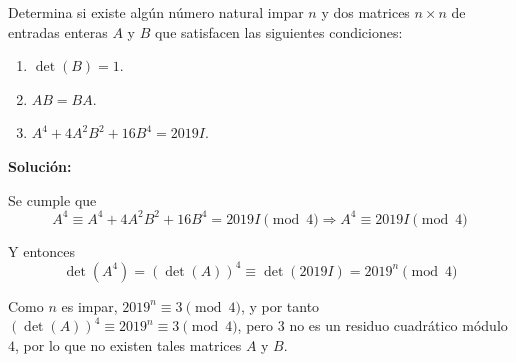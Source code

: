 \documentclass[../../main.tex]{subfiles}
\begin{document}
  \begin{shaded}
    Determina si existe algún número natural impar $n$ y dos matrices $n \times n$ de entradas enteras $A$ y $B$ que satisfacen las siguientes condiciones:

    \begin{enumerate}[1.]
      \item $\det{(B)} = 1$.
      \item $A B = B A$.
      \item $A^4 + 4 A^2 B^2 + 16 B^4 = 2019 I$.
    \end{enumerate}
  \end{shaded}

  \textbf{Solución:}

  Se cumple que
  $$
  A^4 \equiv A^4 + 4 A^2 B^2 + 16 B^4 = 2019 I \pmod{4} \Longrightarrow A^4 \equiv 2019 I \pmod{4}
  $$

  Y entonces
  $$
  \det{(A^4)} = \left(\det{(A)}\right)^4 \equiv \det{(2019 I)} = 2019^n \pmod{4}
  $$

  Como $n$ es impar, $2019^n \equiv 3 \pmod{4}$, y por tanto $\left(\det{(A)}\right)^4 \equiv  2019^n \equiv 3 \pmod{4}$, pero $3$ no es un residuo cuadrático módulo $4$, por lo que no existen tales matrices $A$ y $B$.
\end{document}
